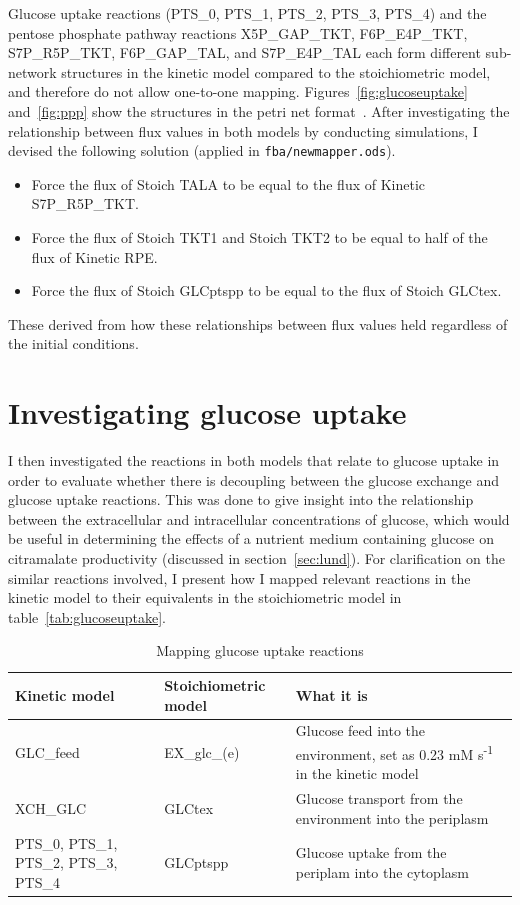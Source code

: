 \documentclass[parskip=full, numbers=noenddot]{scrreprt}
\begin{document}
Glucose uptake reactions (PTS\_0, PTS\_1, PTS\_2, PTS\_3, PTS\_4) and the pentose phosphate pathway reactions X5P\_GAP\_TKT, F6P\_E4P\_TKT, S7P\_R5P\_TKT, F6P\_GAP\_TAL, and S7P\_E4P\_TAL each form different sub-network structures in the kinetic model compared to the stoichiometric model, and therefore do not allow one-to-one mapping. Figures~\vref{fig:glucoseuptake} and~\vref{fig:ppp} show the structures in the petri net format~\cite{gilbert_unifying_2007, murata_petri_1989}. After investigating the relationship between flux values in both models by conducting simulations, I devised the following solution (applied in \texttt{fba/newmapper.ods}).

\begin{itemize}
\item Force the flux of Stoich TALA to be equal to the flux of Kinetic S7P\_R5P\_TKT.
\item Force the flux of Stoich TKT1 and Stoich TKT2 to be equal to half of the flux of Kinetic RPE.
\item Force the flux of Stoich GLCptspp to be equal to the flux of Stoich GLCtex.
\end{itemize}

These derived from how these relationships between flux values held regardless of the initial conditions.

\section{Investigating glucose uptake}
\label{sec:glucoseuptake}

I then investigated the reactions in both models that relate to glucose uptake in order to evaluate whether there is decoupling between the glucose exchange and glucose uptake reactions. This was done to give insight into the relationship between the extracellular and intracellular concentrations of glucose, which would be useful in determining the effects of a nutrient medium containing glucose on citramalate productivity (discussed in section~\ref{sec:lund}). For clarification on the similar reactions involved, I present how I mapped relevant reactions in the kinetic model to their equivalents in the stoichiometric model in table~\vref{tab:glucoseuptake}.

\begin{table}
  \caption{Mapping glucose uptake reactions}
  \label{tab:glucoseuptake}
  \centering
  \begin{tabularx}{\linewidth}{LLL}
    \toprule
    Kinetic model & Stoichiometric model & What it is\\
    \midrule
    GLC\_feed & EX\_glc\_(e) & Glucose feed into the environment, set as 0.23 mM s\textsuperscript{-1} in the kinetic model\\
    XCH\_GLC & GLCtex & Glucose transport from the environment into the periplasm\\
    PTS\_0, PTS\_1, PTS\_2, PTS\_3, PTS\_4 & GLCptspp & Glucose uptake from the periplam into the cytoplasm\\
    \bottomrule
  \end{tabularx}
\end{table}
\end{document}
